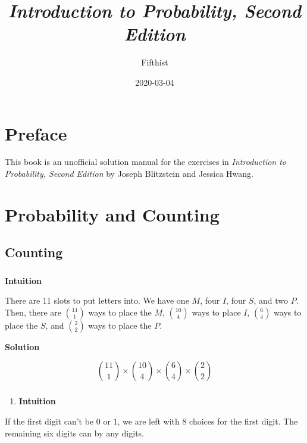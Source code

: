 \documentclass[]{book}
\title{\emph{Introduction to Probability, Second Edition}}
\author{Fifthist}
\date{2020-03-04}
\providecommand{\tightlist}{%
  \setlength{\itemsep}{0pt}\setlength{\parskip}{0pt}}
\begin{document}
\maketitle

{
\setcounter{tocdepth}{1}
\tableofcontents
}
\chapter*{Preface}\label{preface}

This book is an unofficial solution manual for the exercises in
\emph{Introduction to Probability, Second Edition} by Joseph Blitzstein
and Jessica Hwang.

\chapter{Probability and Counting}\label{probability-and-counting}

\section{Counting}\label{counting}

\subsection{}\label{section}

\textbf{Intuition}

There are 11 slots to put letters into. We have one \(M\), four \(I\),
four \(S\), and two \(P\). Then, there are \({11 \choose 1}\) ways to
place the \(M\), \({10 \choose 4}\) ways to place \(I\),
\({6 \choose 4}\) ways to place the \(S\), and \({2 \choose 2}\) ways to
place the \(P\).

\textbf{Solution}

\[ {11 \choose 1} \times {10 \choose 4} \times {6 \choose 4} \times {2 \choose 2} \]

\subsection{}\label{section-1}

\begin{enumerate}
\def\labelenumi{(\alph{enumi})}
\tightlist
\item
  \textbf{Intuition}
\end{enumerate}

If the first digit can't be \(0\) or \(1\), we are left with \(8\)
choices for the first digit. The remaining six digits can by any digits.
\end{document}
